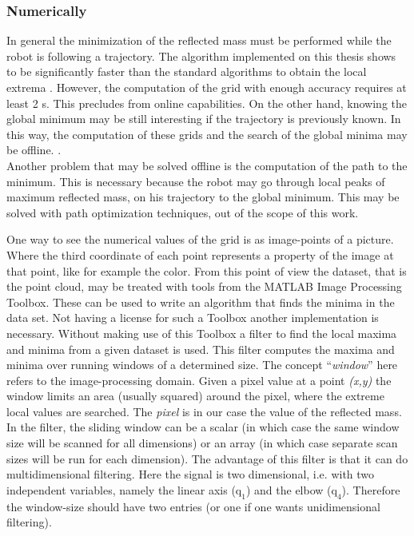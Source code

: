\subsubsection{Numerically}
\label{sec:global_numerical}


In general the minimization of the reflected mass must be performed while the robot is following a trajectory. The algorithm  implemented on this thesis shows to be significantly faster than the standard algorithms to obtain the local extrema \cite{Lemire}. However, the computation of the grid with enough accuracy requires at least 2 s.  This precludes from online capabilities.  On the other hand, knowing the global minimum may be still interesting if the trajectory is previously known. In this way, the computation of these grids and the search of the global minima may be offline. .\\
%
Another problem that may be solved offline is the computation of the path to the minimum. This is necessary because the robot may go through local peaks of maximum reflected mass, on his trajectory to the global minimum. This may be solved with path optimization techniques, out of the scope of this work. 

%
One way to see the numerical values of the grid is as image-points of a picture. Where the third coordinate of each point represents a property of the image at that point, like for example the color. From this point of view the dataset, that is the point cloud, may be treated with tools from the MATLAB Image Processing Toolbox. These can be used to write an algorithm that finds the minima in the data set. Not having a license for such a Toolbox another implementation is necessary.
Without making use of this Toolbox a filter \cite{minmaxfilter} to find the local maxima and minima from a given dataset is used. This filter computes the maxima and minima over running windows of a determined size. The concept “\textit{window}” here refers to the image-processing domain. Given a pixel value at a point \textit{(x,y)} the window limits an area (usually squared) around the pixel, where the extreme local values are searched. The \textit{pixel} is in our case  the value of the reflected mass.\\
%
In the filter, the sliding window can be a scalar (in which case the same window size will be scanned for all dimensions) or an array (in which case separate scan sizes will be run for each dimension). The advantage of this filter is that it can do multidimensional filtering. Here the signal is two dimensional, i.e. with two independent variables, namely the linear axis ($\mathrm{q_1}$) and the elbow ($\mathrm{q_4}$). Therefore the window-size should have two entries (or one if one wants unidimensional filtering).


